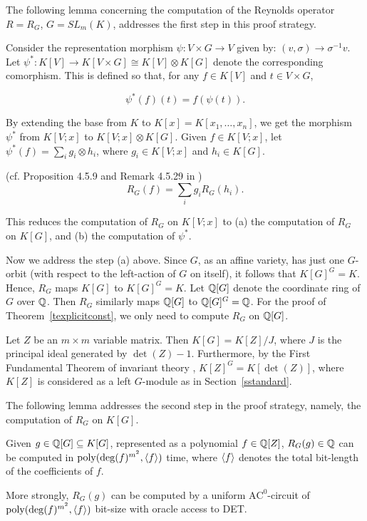 \documentclass[11pt]{article}
\begin{document}
The following  lemma concerning the  computation of the Reynolds operator $R=R_G$, $G=SL_m(K)$,
addresses the first step in this proof strategy.

Consider the representation morphism  $\psi: V \times G \rightarrow V$
given by: $(v,\sigma) \rightarrow \sigma^{-1}  v$.
Let $\psi^*: K[V] \rightarrow K[V \times G] \cong K[V] \otimes K[G]$ denote the corresponding
comorphism.  This is defined so that, for any $f \in K[V]$ and $t \in V \times G$,

\begin{equation} \label{eqpsistar}
\psi^*(f)(t)= f(\psi(t)).
\end{equation} 

By extending the base from $K$ to 
$K[x]=K[x_1,\ldots,x_n]$, we get the morphism $\psi^*$ from 
$K[V;x]$ to $K[V;x] \otimes K[G]$. 
Given 
$f \in K[V;x]$, let  $\psi^*(f)=\sum_i g_i \otimes h_i$, where 
$g_i \in K[V;x]$ and $h_i \in K[G]$. 

\begin{lemma}\label{lreynold1} (cf. Proposition 4.5.9 
and Remark 4.5.29 in  \cite{derksenbook})
\[ R_G(f)= \sum_i g_i R_G(h_i).\] 
\end{lemma} 

This reduces the computation of $R_G$ on $K[V;x]$ 
to (a) the computation of $R_G$ on $K[G]$, and (b) the computation of $\psi^*$.


Now we address the step (a) above. 
Since $G$, as an affine variety, has just one $G$-orbit (with respect 
to the left-action of $G$ on itself), it follows that $K[G]^G=K$. Hence,
$R_G$ maps $K[G]$ to $K[G]^G=K$. Let $\mathbb{Q}[G]$ denote the coordinate ring of $G$ over $\mathbb{Q}$.
Then $R_G$ similarly  maps $\mathbb{Q}[G]$ to $\mathbb{Q}[G]^G=\mathbb{Q}$.  
For the proof of Theorem~\ref{texplicitconst},
we   only need to compute  $R_G$ on $\mathbb{Q}[G]$. 

Let $Z$ be an $m\times m$ variable matrix.
Then   $K[G]=K[Z]/J$, where $J$ is the principal ideal  generated by $\det(Z)-1$.
Furthermore, by the First Fundamental Theorem of invariant theory \cite{fultonrepr},
$K[Z]^G=K[\det(Z)]$, where $K[Z]$ is considered as a left $G$-module 
as in Section~\ref{sstandard}.


The following lemma addresses the second step in the proof strategy, namely, the computation of $R_G$ on $K[G]$. 

\begin{lemma} \label{lreynolds}
Given $g \in \mathbb{Q}[G] \subseteq K[G]$, represented as a polynomial  $f \in \mathbb{Q}[Z]$, 
$R_G(g) \in \mathbb{Q}$ can be  computed in  ${\mbox {poly}}(\deg(f)^{m^2},\langle f \rangle)$ time,
where $\langle f \rangle$ denotes the total bit-length of the coefficients of $f$. 
 
More strongly, $R_G(g)$ can be computed by  a uniform  $\mbox{AC}^0$-circuit of 
${\mbox {poly}}(\deg(f)^{m^2},\langle f \rangle)$ bit-size with oracle access to DET.
\end{lemma}
\end{document}
